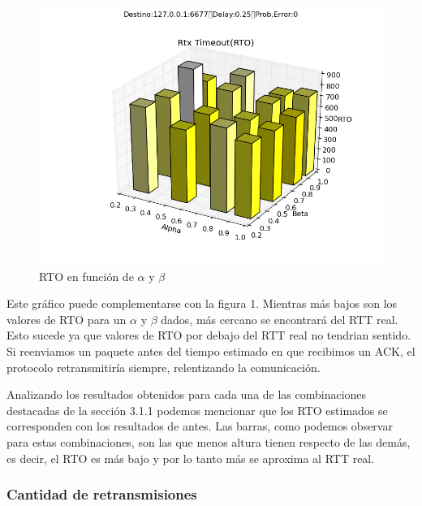 \begin{figure}[H]
  \centering	
	\includegraphics[scale=0.5]{../analisis/graficos_tablas/graficos_en_funcion_de_alfa_y_beta/graficos/rto.png}
  \caption{RTO en funci\'on de $\alpha$ y $\beta$}
	\label{fig:histo-src-sitiotrabajo}
\end{figure}

Este gr\'afico puede complementarse con la figura 1. Mientras m\'as bajos son los valores de RTO para un $\alpha$ y $\beta$ dados, m\'as cercano se encontrar\'a del RTT real. Esto sucede ya que valores de RTO por debajo del RTT real no tendrian sentido. Si reenviamos un paquete antes del tiempo estimado en que recibimos un ACK, el protocolo retransmitir\'ia siempre, relentizando la comunicaci\'on.

Analizando los resultados obtenidos para cada una de las combinaciones destacadas de la secci\'on 3.1.1 podemos mencionar que los RTO estimados se corresponden con los resultados de antes. Las barras, como podemos observar para estas combinaciones, son las que menos altura tienen respecto de las dem\'as, es decir, el RTO es m\'as bajo y por lo tanto m\'as se aproxima al RTT real.

\subsubsection{Cantidad de retransmisiones}

